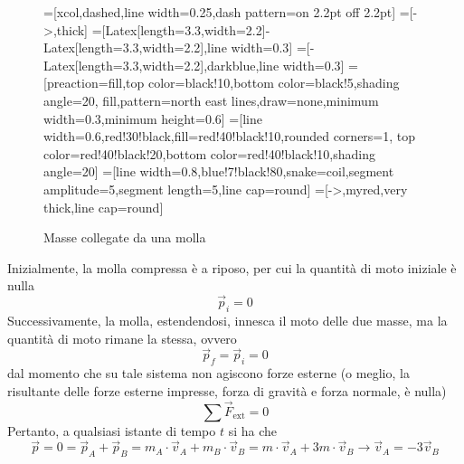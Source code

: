 \documentclass[a4paper]{extarticle}
\begin{document}
\begin{figure}[H]
  \centering
  =[xcol,dashed,line width=0.25,dash pattern=on 2.2pt off 2.2pt]
  =[->,thick] %
  =[{Latex[length=3.3,width=2.2]}-{Latex[length=3.3,width=2.2]},line width=0.3]
  =[-{Latex[length=3.3,width=2.2]},darkblue,line width=0.3]
  =[preaction={fill,top color=black!10,bottom color=black!5,shading angle=20},
                      fill,pattern=north east lines,draw=none,minimum width=0.3,minimum height=0.6]
  =[line width=0.6,red!30!black,fill=red!40!black!10,rounded corners=1,
                    top color=red!40!black!20,bottom color=red!40!black!10,shading angle=20]
  =[line width=0.8,blue!7!black!80,snake=coil,segment amplitude=5,segment length=5,line cap=round]
  \tikzset{>=latex} %
  =[->,myred,very thick,line cap=round]
  \def\tick#1#2{\draw[thick] (#1)++(#2:0.1) --++ (#2-180:0.2)}

  \caption{Masse collegate da una molla}
  \label{fig:masse_collegate_molla}
\end{figure}

\noindent
Inizialmente, la molla compressa è a riposo, per cui la quantità di moto iniziale è nulla
\[\vec p_{i}=0\]
Successivamente, la molla, estendendosi, innesca il moto delle due masse, ma la quantità di moto rimane la stessa, ovvero
\[\vec p_f=\vec p_i=0\]
dal momento che su tale sistema non agiscono forze esterne (o meglio, la risultante delle forze esterne impresse, forza di gravità e forza normale, è nulla)
\[\sum \vec F_{\text{ext}} = 0\]
Pertanto, a qualsiasi istante di tempo $t$ si ha che
\[\vec p = 0 = \vec p_A + \vec p_B = m_A \cdot \vec v_A + m_B \cdot \vec v_B = m \cdot \vec v_A + 3m \cdot \vec v_B \longrightarrow \vec v_A =-3 \vec v_B\]
\end{document}
